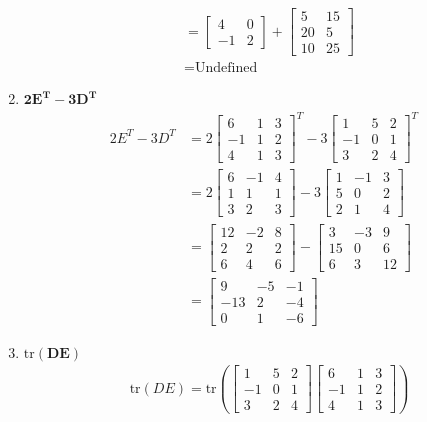 \documentclass[
  letterpaper,
  DIV=11,
  numbers=noendperiod]{scrartcl}
\begin{document}
\begin{enumerate}
\begin{align*}
  &= \begin{bmatrix}4 & 0 \\ -1 & 2 \end{bmatrix} + \begin{bmatrix} 5 & 15 \\ 20 & 5 \\ 10 & 25 \end{bmatrix} \\
  &= \text{Undefined}
  \end{align*}
\item
  \(\symbf{2E^T - 3D^T}\) \begin{align*}
  2E^T - 3D^T &= 2\begin{bmatrix} 6 & 1 & 3 \\ -1 & 1 & 2 \\ 4 & 1 & 3 \end{bmatrix}^T - 3\begin{bmatrix} 1 & 5 & 2 \\ -1 & 0 & 1 \\ 3 & 2 & 4 \end{bmatrix}^T \\
  &= 2\begin{bmatrix} 6 & -1 & 4 \\ 1 & 1 & 1 \\ 3 & 2 & 3 \end{bmatrix} - 3\begin{bmatrix} 1 & -1 & 3 \\ 5 & 0 & 2 \\ 2 & 1 & 4 \end{bmatrix} \\
  &= \begin{bmatrix} 12 & -2 & 8 \\ 2 & 2 & 2 \\ 6 & 4 & 6 \end{bmatrix} - \begin{bmatrix} 3 & -3 & 9 \\ 15 & 0 & 6 \\ 6 & 3 & 12 \end{bmatrix} \\
  &= \begin{bmatrix} 9 & -5 & -1 \\ -13 & 2 & -4 \\ 0 & 1 & -6 \end{bmatrix}
  \end{align*}
\item
  \(\symbf{\mathrm{tr}(DE)}\) \begin{align*}
  &\mathrm{tr}(DE) = \mathrm{tr}\left(\begin{bmatrix}1 & 5 & 2 \\ -1 & 0 & 1 \\ 3 & 2 & 4 \end{bmatrix}\begin{bmatrix}6 & 1 & 3 \\ -1 & 1 & 2 \\ 4 & 1 & 3 \end{bmatrix}\right) \\

\end{align*}
\end{enumerate}
\end{document}
